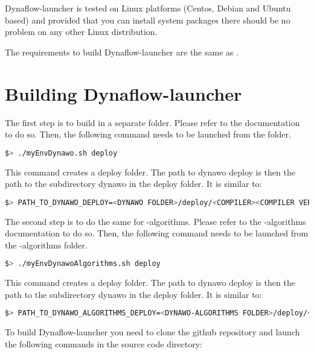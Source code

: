\documentclass[a4paper, 12pt]{report}
\begin{document}
Dynaflow-launcher is tested on Linux platforms (Centos, Debian and Ubuntu based) and provided that you can install system packages there should be no problem on any other Linux distribution.

The requirements to build Dynaflow-launcher are the same as \Dynawo.

\section[Building Dynaflow-launcher]{Building Dynaflow-launcher}
\label{Dynaflow_launcher_Installation_Documentation_Building_Dynaflow_launcher}
The first step is to build \Dynawo in a separate folder. Please refer to the \Dynawo documentation to do so.
Then, the following command needs to be launched from the \Dynawo folder.

\begin{lstlisting}[language=bash]
$> ./myEnvDynawo.sh deploy
\end{lstlisting}

This command creates a deploy folder. The path to dynawo deploy is then the path to the subdirectory dynawo in the deploy folder. It is similar to:

\begin{lstlisting}[language=bash]
$> PATH_TO_DYNAWO_DEPLOY=<DYNAWO FOLDER>/deploy/<COMPILER><COMPILER VERSION>/shared/dynawo/
\end{lstlisting}

The second step is to do the same for \Dynawo-algorithms. Please refer to the \Dynawo-algorithms documentation to do so.
Then, the following command needs to be launched from the \Dynawo-algorithms folder.

\begin{lstlisting}[language=bash]
$> ./myEnvDynawoAlgorithms.sh deploy
\end{lstlisting}

This command creates a deploy folder. The path to dynawo deploy is then the path to the subdirectory dynawo in the deploy folder. It is similar to:

\begin{lstlisting}[language=bash]
$> PATH_TO_DYNAWO_ALGORITHMS_DEPLOY=<DYNAWO-ALGORITHMS FOLDER>/deploy/<COMPILER><COMPILER VERSION>/shared/dynawo/
\end{lstlisting}


To build Dynaflow-launcher you need to clone the github repository and launch the following commands in the source code directory:
\end{document}
